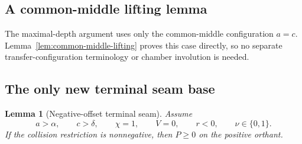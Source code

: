 \documentclass[11pt]{article}
\newtheorem{lemma}[theorem]{Lemma}
\theoremstyle{definition}
\begin{document}
\subsection{A common-middle lifting lemma}

The maximal-depth argument uses only the common-middle configuration \(a=c\).  Lemma~\ref{lem:common-middle-lifting} proves this case directly, so no separate transfer-configuration terminology or chamber involution is needed.

\subsection{The only new terminal seam base}

\begin{lemma}[Negative-offset terminal seam]
\label{lem:negative-terminal-seam}
Assume
\begin{equation*}
a>\alpha,
\qquad c>\delta,
\qquad \chi=1,
\qquad V=0,
\qquad r<0,
\qquad \nu\in\{0,1\}.
\end{equation*}
If the collision restriction is nonnegative, then \(P\ge0\) on the positive orthant.
\end{lemma}
\end{document}
